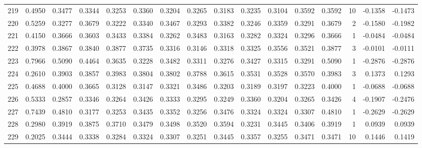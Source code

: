 \begin{tabular}{lrrrrrrrrrrrrrrr}
219 &      0.4950 &  0.3477 &  0.3344 &  0.3253 &  0.3360 &  0.3204 &  0.3265 &  0.3183 &  0.3235 &  0.3104 &   0.3592 &     0.3592 &     10 &                   -0.1358 &                    -0.1473 \\
220 &      0.5259 &  0.3277 &  0.3679 &  0.3222 &  0.3340 &  0.3467 &  0.3293 &  0.3382 &  0.3246 &  0.3359 &   0.3291 &     0.3679 &      2 &                   -0.1580 &                    -0.1982 \\
221 &      0.4150 &  0.3666 &  0.3603 &  0.3433 &  0.3384 &  0.3262 &  0.3483 &  0.3163 &  0.3282 &  0.3324 &   0.3296 &     0.3666 &      1 &                   -0.0484 &                    -0.0484 \\
222 &      0.3978 &  0.3867 &  0.3840 &  0.3877 &  0.3735 &  0.3316 &  0.3146 &  0.3318 &  0.3325 &  0.3556 &   0.3521 &     0.3877 &      3 &                   -0.0101 &                    -0.0111 \\
223 &      0.7966 &  0.5090 &  0.4464 &  0.3635 &  0.3228 &  0.3482 &  0.3311 &  0.3276 &  0.3427 &  0.3315 &   0.3291 &     0.5090 &      1 &                   -0.2876 &                    -0.2876 \\
224 &      0.2610 &  0.3903 &  0.3857 &  0.3983 &  0.3804 &  0.3802 &  0.3788 &  0.3615 &  0.3531 &  0.3528 &   0.3570 &     0.3983 &      3 &                    0.1373 &                     0.1293 \\
225 &      0.4688 &  0.4000 &  0.3665 &  0.3128 &  0.3147 &  0.3321 &  0.3486 &  0.3203 &  0.3189 &  0.3197 &   0.3223 &     0.4000 &      1 &                   -0.0688 &                    -0.0688 \\
226 &      0.5333 &  0.2857 &  0.3346 &  0.3264 &  0.3426 &  0.3333 &  0.3295 &  0.3249 &  0.3360 &  0.3204 &   0.3265 &     0.3426 &      4 &                   -0.1907 &                    -0.2476 \\
227 &      0.7439 &  0.4810 &  0.3177 &  0.3253 &  0.3435 &  0.3352 &  0.3256 &  0.3476 &  0.3324 &  0.3324 &   0.3307 &     0.4810 &      1 &                   -0.2629 &                    -0.2629 \\
228 &      0.2980 &  0.3919 &  0.3875 &  0.3710 &  0.3479 &  0.3498 &  0.3520 &  0.3594 &  0.3231 &  0.3445 &   0.3406 &     0.3919 &      1 &                    0.0939 &                     0.0939 \\
229 &      0.2025 &  0.3444 &  0.3338 &  0.3284 &  0.3324 &  0.3307 &  0.3251 &  0.3445 &  0.3357 &  0.3255 &   0.3471 &     0.3471 &     10 &                    0.1446 &                     0.1419 \\

\end{tabular}
